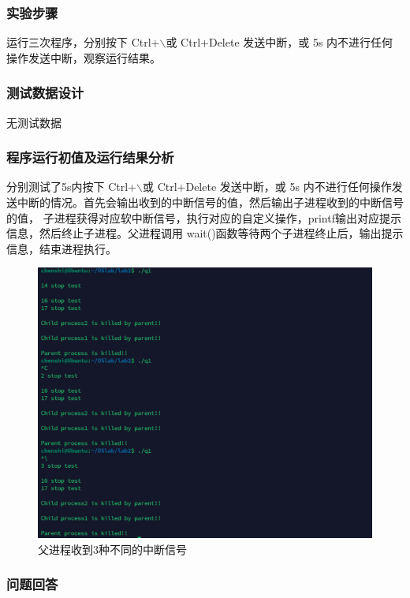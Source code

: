 \documentclass{article}
\begin{document}
    \subsubsection{实验步骤}

    运行三次程序，分别按下 Ctrl+$\backslash$或 Ctrl+Delete 发送中断，或 5s 内不进行任何操作发送中断，观察运行结果。

    \subsubsection{测试数据设计}

    无测试数据

    \subsubsection{程序运行初值及运行结果分析}

    分别测试了5s内按下 Ctrl+$\backslash$或 Ctrl+Delete 发送中断，或 5s 内不进行任何操作发送中断的情况。首先会输出收到的中断信号的值，然后输出子进程收到的中断信号的值，
    子进程获得对应软中断信号，执行对应的自定义操作，printf输出对应提示信息，然后终止子进程。父进程调用 wait()函数等待两个子进程终止后，输出提示信息，结束进程执行。
    \begin{figure}[htbp]
        \centering
        \includegraphics[scale=0.5]{picture/13.png}
        \caption{父进程收到3种不同的中断信号}
        \label{13}
    \end{figure}

    \subsubsection{问题回答}
\end{document}
